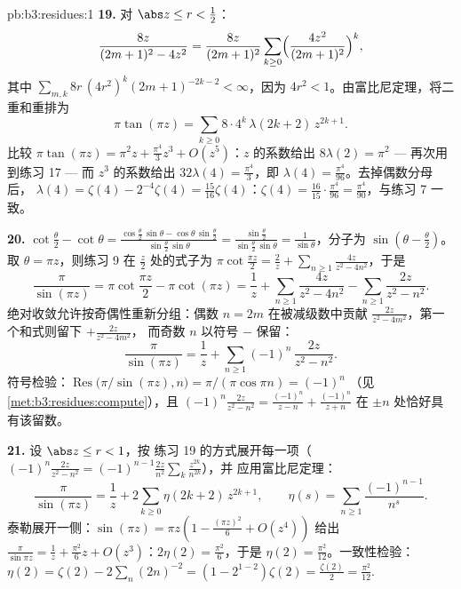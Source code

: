 \begin{solution}{pb:b3:residues:1}
\textbf{19.} 对 $\abs z \leq r < \frac12$：
\[
\frac{8z}{(2m+1)^2 - 4z^2} = \frac{8z}{(2m+1)^2}
\sum_{k\geq0}\Bigl(\frac{4z^2}{(2m+1)^2}\Bigr)^{k},
\]
其中 $\sum_{m,k}8r\,(4r^2)^k(2m+1)^{-2k-2} < \infty$，因为
$4r^2 < 1$。由富比尼定理，将二重和重排为
\[
\pi\tan(\pi z) =
\sum_{k\geq0}8\cdot4^k\,\lambda(2k+2)\,z^{2k+1} .
\]
比较 $\pi\tan(\pi z) = \pi^2z + \frac{\pi^4}3z^3 +
O(z^5)$：$z$ 的系数给出 $8\lambda(2) = \pi^2$
--- 再次用到练习 17 --- 而 $z^3$ 的系数给出
$32\lambda(4) = \frac{\pi^4}3$，即 $\lambda(4) =
\frac{\pi^4}{96}$。去掉偶数分母后，
$\lambda(4) = \zeta(4) - 2^{-4}\zeta(4) =
\frac{15}{16}\zeta(4)$：$\zeta(4) = \frac{16}{15}\cdot
\frac{\pi^4}{96} = \frac{\pi^4}{90}$，与练习 7 一致。

\textbf{20.} $\cot\frac\theta2 - \cot\theta =
\frac{\cos\frac\theta2\,\sin\theta -
\cos\theta\,\sin\frac\theta2}{\sin\frac\theta2\,\sin\theta}
= \frac{\sin\frac\theta2}{\sin\frac\theta2\,\sin\theta} =
\frac1{\sin\theta}$，分子为 $\sin(\theta -
\frac\theta2)$。取 $\theta = \pi z$，则练习 9 在
$\frac z2$ 处的式子为 $\pi\cot\frac{\pi z}2 = \frac2z +
\sum_{n\geq1}\frac{4z}{z^2 - 4n^2}$，于是
\[
\frac{\pi}{\sin(\pi z)}
= \pi\cot\frac{\pi z}2 - \pi\cot(\pi z)
= \frac1z + \sum_{n\geq1}\frac{4z}{z^2 - 4n^2}
- \sum_{n\geq1}\frac{2z}{z^2 - n^2} .
\]
绝对收敛允许按奇偶性重新分组：偶数 $n
= 2m$ 在被减级数中贡献
$\frac{2z}{z^2-4m^2}$，第一个和式则留下 $+\frac{2z}{z^2-4m^2}$，
而奇数 $n$ 以符号 $-$ 保留：
\[
\frac{\pi}{\sin(\pi z)} = \frac1z +
\sum_{n\geq1}(-1)^n\,\frac{2z}{z^2 - n^2} .
\]
符号检验：$\operatorname{Res}\bigl(\pi/\sin(\pi z),
n\bigr) = \pi/(\pi\cos\pi n) = (-1)^n$
（见\cref{met:b3:residues:compute}），且 $(-1)^n\frac{2z}{z^2 -
n^2} = \frac{(-1)^n}{z-n} + \frac{(-1)^n}{z+n}$ 在
$\pm n$ 处恰好具有该留数。

\textbf{21.} 设 $\abs z \leq r < 1$，按
练习 19 的方式展开每一项（$(-1)^n\frac{2z}{z^2-n^2} =
(-1)^{n-1}\frac{2z}{n^2}\sum_k\frac{z^{2k}}{n^{2k}}$），并
应用富比尼定理：
\[
\frac{\pi}{\sin(\pi z)} = \frac1z +
2\sum_{k\geq0}\eta(2k+2)\,z^{2k+1},
\qquad
\eta(s) = \sum_{n\geq1}\frac{(-1)^{n-1}}{n^s} .
\]
泰勒展开一侧：$\sin(\pi z) = \pi z(1 - \frac{(\pi z)^2}6 +
O(z^4))$ 给出 $\frac\pi{\sin\pi z} = \frac1z +
\frac{\pi^2}6z + O(z^3)$：$2\eta(2) = \frac{\pi^2}6$，于是
$\eta(2) = \frac{\pi^2}{12}$。一致性检验：$\eta(2) =
\zeta(2) - 2\sum_n(2n)^{-2} = (1 - 2^{1-2})\zeta(2) =
\frac{\zeta(2)}2 = \frac{\pi^2}{12}$.


\end{solution}

